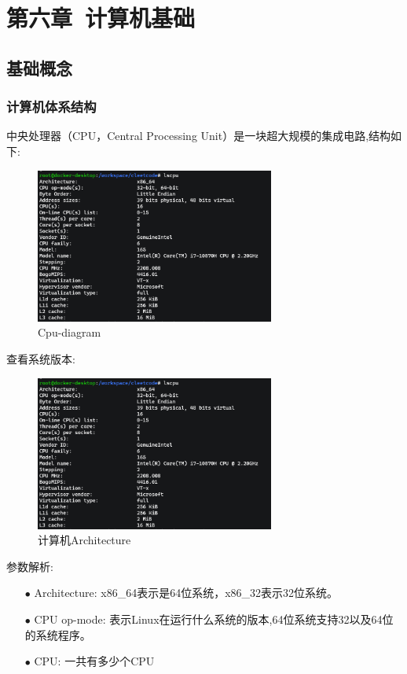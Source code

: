 \documentclass[12pt]{book}
\begin{document}
\newpage

\fancyhead{}

\chapter{第六章\ 计算机基础}
\section{基础概念}
\subsection{计算机体系结构}
中央处理器（CPU，Central Processing Unit）是一块超大规模的集成电路,结构如下:
\begin{figure}[H]
	\centering
	\includegraphics[width=0.7\textwidth]{images/cpu_architecture.png}
	\caption{Cpu-diagram}
	\label{Cpu-diagram}
\end{figure}

查看系统版本:
\begin{figure}[H]
	\centering
	\includegraphics[width=0.7\textwidth]{images/cpu_architecture.png}
	\caption{计算机Architecture}
	\label{cpu-architecture}
\end{figure}
参数解析:\newline
\begin{itemize}
\item[$\bullet$] Architecture: x86\_64表示是64位系统，x86\_32表示32位系统。
\item[$\bullet$] CPU op-mode: 表示Linux在运行什么系统的版本,64位系统支持32以及64位的系统程序。
\item[$\bullet$] CPU: 一共有多少个CPU
\end{itemize}
\end{document}

